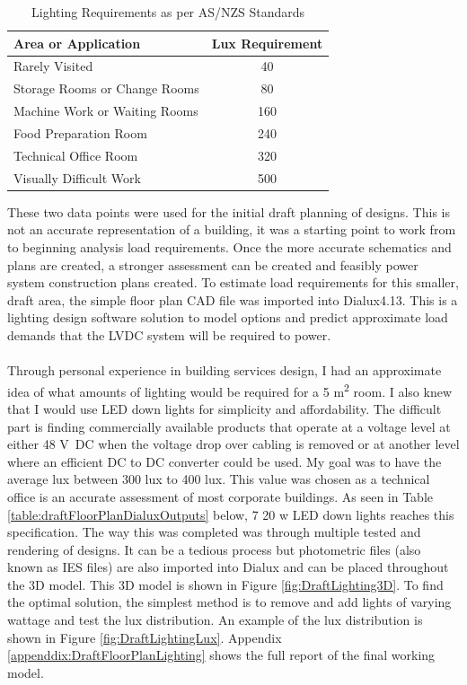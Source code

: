\begin{table}[H]
\centering
\renewcommand{\arraystretch}{2}
\begin{tabular}{|l|c|}
\hline
\textbf{Area or Application} & \multicolumn{1}{l|}{\textbf{Lux Requirement}} \\ \hline
Rarely Visited & 40 \\ \hline
Storage Rooms or Change Rooms & 80 \\ \hline
Machine Work or Waiting Rooms & 160 \\ \hline
Food Preparation Room & 240 \\ \hline
Technical Office Room & 320 \\ \hline
Visually Difficult Work & 500 \\ \hline
\end{tabular}
\caption{Lighting Requirements as per AS/NZS Standards \cite{StandardsAustralia2006_2}}
\label{table:LightingRequirements}
\end{table}

These two data points were used for the initial draft planning of designs. This is not an accurate representation of a building, it was a starting point to work from to beginning analysis load requirements. Once the more accurate schematics and plans are created, a stronger assessment can be created and feasibly power system construction plans created. To estimate load requirements for this smaller, draft area, the simple floor plan CAD file was imported into Dialux4.13. This is a lighting design software solution to model options and predict approximate load demands that the LVDC system will be required to power.  

\paragraph{}
Through personal experience in building services design, I had an approximate idea of what amounts of lighting would be required for a 5 \si{m^2} room. I also knew that I would use LED down lights for simplicity and affordability. The difficult part is finding commercially available products that operate at a voltage level at either 48 \si{V DC} when the voltage drop over cabling is removed or at another level where an efficient DC to DC converter could be used. My goal was to have the average lux between 300 \si{lux} to 400 \si{lux}. This value was chosen as a technical office is an accurate assessment of most corporate buildings. As seen in Table \ref{table:draftFloorPlanDialuxOutputs} below, 7 20 \si{w} LED down lights reaches this specification. The way this was completed was through multiple tested and rendering of designs. It can be a tedious process but photometric files (also known as IES files) are also imported into Dialux and can be placed throughout the 3D model. This 3D model is shown in Figure \ref{fig:DraftLighting3D}. To find the optimal solution, the simplest method is to remove and add lights of varying wattage and test the lux distribution. An example of the lux distribution is shown in Figure \ref{fig:DraftLightingLux}. Appendix \ref{appenddix:DraftFloorPlanLighting} shows the full report of the final working model.   

